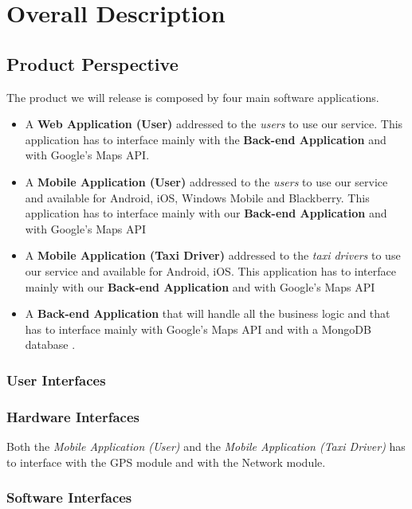 \documentclass[12pt, a4paper]{article}
\begin{document}
\section{Overall Description}
\subsection{Product Perspective}

The product we will release is composed by four main software applications.
\begin{itemize}
  \item A \textbf{Web Application (User)} addressed to the \emph{users}  to use our service. This application has to interface mainly with the \textbf{Back-end Application} and with Google's Maps API.
  \item A \textbf{Mobile Application (User)} addressed to the \emph{users} to use our service and available for Android, iOS, Windows Mobile and Blackberry. This application has to interface mainly with our \textbf{Back-end Application} and with Google's Maps API
  \item A \textbf{Mobile Application (Taxi Driver)} addressed to the \emph{taxi drivers} to use our service and available for Android, iOS. This application has to interface mainly with our \textbf{Back-end Application} and with Google's Maps API

  \item A \textbf{Back-end Application} that will handle all the business logic and that has to interface mainly with Google's Maps API and with a MongoDB database .
\end{itemize}

\subsubsection{User Interfaces}
\subsubsection{Hardware Interfaces}
Both the \emph{Mobile Application (User)} and the \emph{Mobile Application (Taxi Driver)} has to interface with the GPS module and with the Network module.\\

\subsubsection{Software Interfaces}
\end{document}
